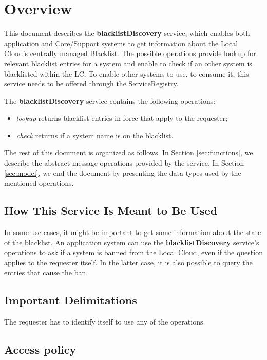 \documentclass[a4paper]{arrowhead}
\begin{document}
\section{Overview}
\label{sec:overview}
This document describes the \textbf{blacklistDiscovery} service, which enables both application and Core/Support systems to get information about the Local Cloud's centrally managed Blacklist. The possible operations provide lookup for relevant blacklist entries for a system and enable to check if an other system is blacklisted within the LC. To enable other systems to use, to consume it, this service needs to be offered through the ServiceRegistry.

The \textbf{blacklistDiscovery} service contains the following operations:

\begin{itemize}
    \item \textit{lookup} returns blacklist entries in force that apply to the requester;
    \item \textit{check} returns if a system name is on the blacklist.
\end{itemize}

The rest of this document is organized as follows.
In Section \ref{sec:functions}, we describe the abstract message operations provided by the service.
In Section \ref{sec:model}, we end the document by presenting the data types used by the mentioned operations.

\subsection{How This Service Is Meant to Be Used}
In some use cases, it might be important to get some information about the state of the blacklist. An application system can use the \textbf{blacklistDiscovery} service's operations to ask if a system is banned from the Local Cloud, even if the question applies to the requester itself. In the latter case, it is also possible to query the entries that cause the ban.

\subsection{Important Delimitations}
\label{sec:delimitations}

The requester has to identify itself to use any of the operations.

\subsection{Access policy}
\label{sec:accesspolicy}
\end{document}

